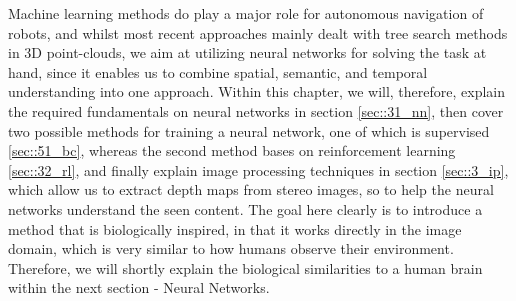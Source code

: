 \FloatBarrier
\label{sec::3_ml}
Machine learning methods do play a major role for autonomous navigation of robots, and whilst most recent approaches mainly dealt with tree search methods in 3D point-clouds, we aim at utilizing neural networks for solving the task at hand, since it enables us to combine spatial, semantic, and temporal understanding into one approach. Within this chapter, we will, therefore, explain the required fundamentals on neural networks in section \ref{sec::31_nn}, then cover two possible methods for training a neural network, one of which is supervised \ref{sec::51_bc}, whereas the second method bases on reinforcement learning \ref{sec::32_rl}, and finally explain image processing techniques in section \ref{sec::3_ip}, which allow us to extract depth maps from stereo images, so to help the neural networks understand the seen content. The goal here clearly is to introduce a method that is biologically inspired, in that it works directly in the image domain, which is very similar to how humans observe their environment. Therefore, we will shortly explain the biological similarities to a human brain within the next section - Neural Networks.